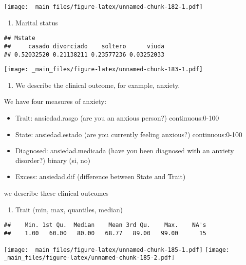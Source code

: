 \documentclass[
]{book}
\providecommand{\tightlist}{%
  \setlength{\itemsep}{0pt}\setlength{\parskip}{0pt}}
\begin{document}
\texttt{[image: \_main\_files/figure-latex/unnamed-chunk-182-1.pdf]}

\begin{enumerate}
\def\labelenumi{\alph{enumi}.}
\setcounter{enumi}{3}
\tightlist
\item
  Marital status
\end{enumerate}

\begin{verbatim}
## Mstate
##     casado divorciado    soltero      viuda 
## 0.52032520 0.21138211 0.23577236 0.03252033
\end{verbatim}

\texttt{[image: \_main\_files/figure-latex/unnamed-chunk-183-1.pdf]}

\begin{enumerate}
\def\labelenumi{\arabic{enumi}.}
\setcounter{enumi}{1}
\tightlist
\item
  We describe the clinical outcome, for example, anxiety.
\end{enumerate}

We have four measures of anxiety:

\begin{itemize}
\tightlist
\item
  Trait: ansiedad.rasgo (are you an anxious person?) continuous:0-100
\item
  State: ansiedad.estado (are you currently feeling anxious?) continuous:0-100
\item
  Diagnosed: ansiedad.medicada (have you been diagnosed with an anxiety disorder?) binary (si, no)
\item
  Excess: ansiedad.dif (difference between State and Trait)
\end{itemize}

we describe these clinical outcomes

\begin{enumerate}
\def\labelenumi{\alph{enumi}.}
\tightlist
\item
  Trait (min, max, quantiles, median)
\end{enumerate}

\begin{verbatim}
##    Min. 1st Qu.  Median    Mean 3rd Qu.    Max.    NA's 
##    1.00   60.00   80.00   68.77   89.00   99.00      15
\end{verbatim}

\texttt{[image: \_main\_files/figure-latex/unnamed-chunk-185-1.pdf]} \texttt{[image: \_main\_files/figure-latex/unnamed-chunk-185-2.pdf]}
\end{document}
